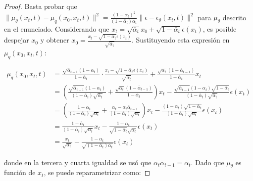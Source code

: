 \begin{proof}
    Basta probar que $\| \mu_\theta(x_t,t) - \mu_q(x_0,x_t,t) \|^2 = \frac{(1-\alpha_t)^2}{(1-\bar\alpha_t)\alpha_t} \| \epsilon - \epsilon_\theta(x_t,t) \|^2$ para $\mu_\theta$ descrito en el enunciado. Considerando que $x_t = \sqrt{\overline{\alpha}_t}x_0 + \sqrt{1-\overline{\alpha}_t}\epsilon(x_t)$, es posible despejar $x_0$ y obtener $x_0 = \frac{x_t - \sqrt{1-\overline{\alpha}_t}\epsilon(x_t)}{\sqrt{\overline{\alpha}_t}}$. Sustituyendo esta expresión en $\mu_q(x_0,x_t,t)$:

    \begin{align}
        \mu_q(x_0,x_t,t) & = \frac{\sqrt{\overline{\alpha}_{t-1}}(1-\alpha_t)}{1-\overline{\alpha}_t}\cdot\frac{x_t - \sqrt{1-\overline{\alpha}_t}\epsilon(x_t)}{\sqrt{\overline{\alpha}_t}} + \frac{\sqrt{\alpha_t}(1-\overline{\alpha}_{t-1})}{1-\overline{\alpha}_t}x_t \\
                         & = \left(\frac{\sqrt{\overline{\alpha}_{t-1}}(1-\alpha_t)}{(1-\overline{\alpha}_t)\sqrt{\overline{\alpha}_t}} + \frac{\sqrt{\alpha_t}(1-\overline{\alpha}_{t-1})}{1-\overline{\alpha}_t}\right) x_t
        -\frac{\sqrt{\overline{\alpha}_{t-1}}(1-\alpha_t)\sqrt{1-\overline{\alpha}_t}}{(1-\overline{\alpha}_t)\sqrt{\overline{\alpha}_t}}\epsilon(x_t)                                                                                                                     \\
                         & = \left(\frac{1-\alpha_t}{(1-\overline{\alpha}_t)\sqrt{\alpha_t}} + \frac{\alpha_t - \alpha_t\overline{\alpha}_{t-1}}{(1-\overline{\alpha}_t)\sqrt{\alpha_t}}
        \right)x_t - \frac{(1-\alpha_t)\sqrt{1-\overline{\alpha}_t}}{(1-\overline{\alpha}_t)\sqrt{\alpha_t}}\epsilon(x_t)                                                                                                                                                  \\
                         & =\frac{1-\overline{\alpha}_t}{(1-\overline{\alpha}_t)\sqrt{\alpha_t}}x_t - \frac{1-\alpha_t}{\sqrt{1-\overline{\alpha}_t}\sqrt{\alpha_t}}\epsilon(x_t)                                                                                          \\
                         & =\frac{x_t}{\sqrt{\alpha_t}} - \frac{1-\alpha_t}{\sqrt{(1-\overline{\alpha}_t)\alpha_t}}\epsilon(x_t)
    \end{align}

    donde en la tercera y cuarta igualdad se usó que $\alpha_t\overline{\alpha}_{t-1} = \overline{\alpha}_t$. Dado que $\mu_\theta$ es función de $x_t$, se puede reparametrizar como:


\end{proof}
